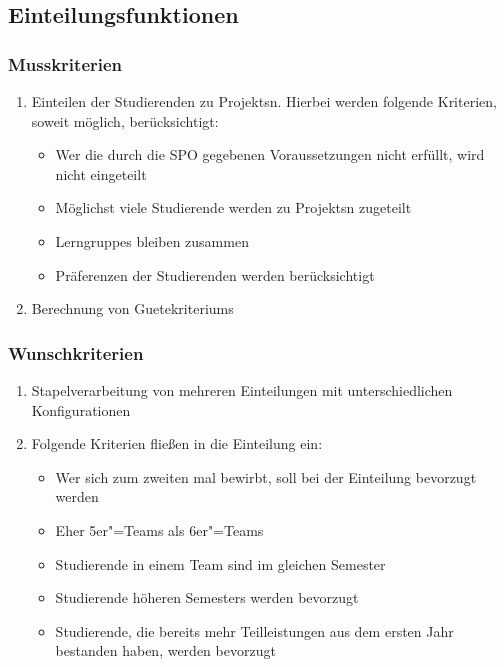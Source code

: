 \documentclass[parskip=full]{scrartcl}
\newcommand{\swtLabel}[1]{\textbf{/#1\arabic*0/}}
\begin{document}
\subsection{Einteilungsfunktionen}
\subsubsection{Musskriterien}
\begin{enumerate}[label=\swtLabel{FA}, resume]
  \item Einteilen der Studierenden zu \glspl{Projekt}n. Hierbei werden folgende
  Kriterien, soweit möglich, berücksichtigt:
  \begin{itemize}
    \item Wer die durch die \gls{SPO} gegebenen Voraussetzungen nicht erfüllt,
    wird nicht eingeteilt \label{FAeinteilung}
    \item Möglichst viele Studierende werden zu \glspl{Projekt}n zugeteilt 
    \item \glspl{Lerngruppe} bleiben zusammen
    \item Präferenzen der Studierenden werden berücksichtigt 
 \end{itemize} \label{FAeinteilungMussKriterien}
 \item Berechnung von \glspl{Guetekriterium} \label{FAguetekriterien}
\end{enumerate}

 \subsubsection{Wunschkriterien}
 
 \begin{enumerate}[label=\swtLabel{FA}, resume]
 \item Stapelverarbeitung von mehreren Einteilungen mit unterschiedlichen
 Konfigurationen \label{FAeinteilungStapel}\item Folgende Kriterien fließen in die Einteilung ein:
 \begin{itemize}
 	\item Wer sich zum zweiten mal bewirbt, soll bei der Einteilung bevorzugt werden
 	\item Eher 5er"=Teams als 6er"=Teams
 	\item Studierende in einem Team sind im gleichen Semester
 	\item Studierende höheren Semesters werden bevorzugt
 	\item Studierende, die bereits mehr Teilleistungen aus dem ersten Jahr
 	bestanden haben, werden bevorzugt
 \end{itemize} \label{FAeinteilungWunschKriterien}
\end{enumerate}
\end{document}
